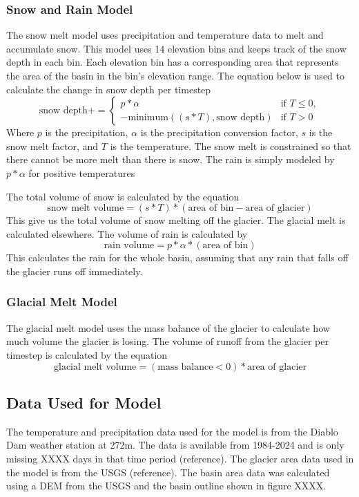 \documentclass{article}
\begin{document}
\subsubsection{Snow and Rain Model}
The snow melt model uses precipitation and temperature data to melt and accumulate snow. This model uses 14 elevation bins and keeps track 
of the snow depth in each bin. Each elevation bin has a corresponding area that represents the area of the basin in the bin's elevation range. 
The equation below is used to calculate the change in snow depth per timestep 
\begin{equation}\text{snow depth} += 
\begin{cases} 
  p*\alpha & \text{if } T \leq 0,\\
  -\text{minimum}((s*T),\text{snow depth}) & \text{if } T > 0
\end{cases}\end{equation}
Where $p$ is the precipitation, $\alpha$ is the precipitation conversion factor, $s$ is the snow melt factor, and $T$ is 
the temperature. The snow melt is constrained so that there cannot be more melt than there is snow. The rain is simply modeled by $p*\alpha$ 
for positive temperatures

The total volume of snow is calculated by the equation
\begin{equation}\text{snow melt volume}=(s*T)*(\text{area of bin}-\text{area of glacier})\end{equation}
This give us the total volume of snow melting off the glacier. The glacial melt is calculated elsewhere. The volume of rain is calculated by
\begin{equation}\text{rain volume}=p*\alpha*(\text{area of bin})\end{equation}
This calculates the rain for the whole basin, assuming that any rain that falls off the glacier runs off immediately.

\subsubsection{Glacial Melt Model}
The glacial melt model uses the mass balance of the glacier to calculate how much volume the glacier is losing. The volume of runoff from the 
glacier per timestep is calculated by the equation
\begin{equation}\text{glacial melt volume}=(\text{mass balance}<0)*\text{area of glacier}\end{equation}
\subsection{Data Used for Model}
The temperature and precipitation data used for the model is from the Diablo Dam weather station at 272m. The data is available from 1984-2024 
and is only missing XXXX days in that time period (reference). The glacier area data used in the model is from the USGS (reference). The basin 
area data was calculated using a DEM from the USGS and the basin outline shown in figure XXXX.
\end{document}
